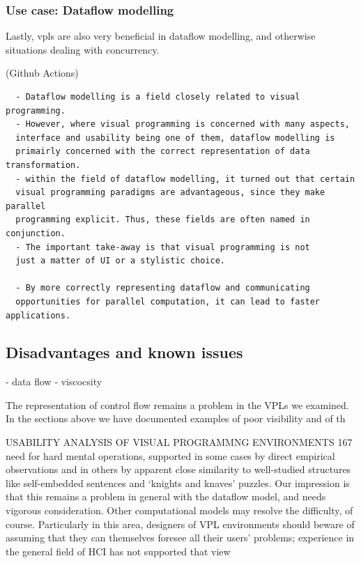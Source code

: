 \subsubsection{Use case: Dataflow modelling}
Lastly, vpls are also very beneficial in dataflow modelling, and otherwise situations dealing with concurrency. 

(Github Actions)

\begin{lstlisting}
  - Dataflow modelling is a field closely related to visual programming.
  - However, where visual programming is concerned with many aspects, 
  interface and usability being one of them, dataflow modelling is 
  primairly concerned with the correct representation of data transformation.   
  - within the field of dataflow modelling, it turned out that certain 
  visual programming paradigms are advantageous, since they make parallel 
  programming explicit. Thus, these fields are often named in conjunction. 
  - The important take-away is that visual programming is not 
  just a matter of UI or a stylistic choice.
  
  - By more correctly representing dataflow and communicating 
  opportunities for parallel computation, it can lead to faster applications.
  \end{lstlisting}
  

\subsection{Disadvantages and known issues}

- data flow
- viscocsity

The representation of control flow remains a problem in the VPLs we examined. In the sections above we have documented examples of poor visibility and of th

USABILITY ANALYSIS OF VISUAL PROGRAMMNG ENVIRONMENTS 167 need for hard mental operations, supported in some cases by direct empirical observations and in others by apparent close similarity to well-studied structures like self-embedded sentences and ‘knights and knaves’ puzzles. Our impression is that this remains a problem in general with the dataflow model, and needs vigorous consideration. Other computational models may resolve the difficulty, of course. Particularly in this area, designers of VPL environments should beware of assuming that they can themselves foresee all their users’ problems; experience in the general field of HCI has not supported that view


